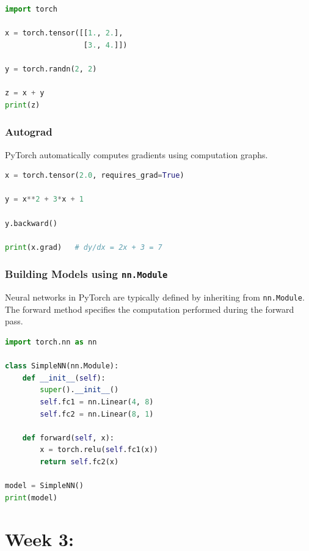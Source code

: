 \documentclass[12pt]{article}
\begin{document}
\begin{lstlisting}[language=Python]
import torch

x = torch.tensor([[1., 2.],
                  [3., 4.]])

y = torch.randn(2, 2)

z = x + y
print(z)
\end{lstlisting}

\subsubsection{Autograd}
PyTorch automatically computes gradients using computation graphs.

\begin{lstlisting}[language=Python]
x = torch.tensor(2.0, requires_grad=True)

y = x**2 + 3*x + 1

y.backward()

print(x.grad)   # dy/dx = 2x + 3 = 7
\end{lstlisting}

\subsubsection{Building Models using \texttt{nn.Module}}
Neural networks in PyTorch are typically defined by inheriting from \texttt{nn.Module}. The forward method specifies the computation performed during the forward pass.

\begin{lstlisting}[language=Python]
import torch.nn as nn

class SimpleNN(nn.Module):
    def __init__(self):
        super().__init__()
        self.fc1 = nn.Linear(4, 8)
        self.fc2 = nn.Linear(8, 1)

    def forward(self, x):
        x = torch.relu(self.fc1(x))
        return self.fc2(x)

model = SimpleNN()
print(model)
\end{lstlisting}

\section{Week 3:}
\end{document}
